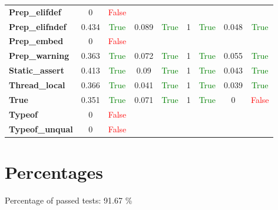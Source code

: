 \documentclass{article}
\begin{document}
\begin{xltabular}{\textwidth}{lcccccccc}
\textbf{Prep\_elifdef}& 0&\textcolor{red}{False} \\[0.5ex]
\textbf{Prep\_elifndef}& 0.434&\textcolor{green}{True}& 0.089&\textcolor{green}{True}& 1&\textcolor{green}{True}& 0.048&\textcolor{green}{True} \\[0.5ex]
\textbf{Prep\_embed}& 0&\textcolor{red}{False} \\[0.5ex]
\textbf{Prep\_warning}& 0.363&\textcolor{green}{True}& 0.072&\textcolor{green}{True}& 1&\textcolor{green}{True}& 0.055&\textcolor{green}{True} \\[0.5ex]
\textbf{Static\_assert}& 0.413&\textcolor{green}{True}& 0.09&\textcolor{green}{True}& 1&\textcolor{green}{True}& 0.043&\textcolor{green}{True} \\[0.5ex]
\textbf{Thread\_local}& 0.366&\textcolor{green}{True}& 0.041&\textcolor{green}{True}& 1&\textcolor{green}{True}& 0.039&\textcolor{green}{True} \\[0.5ex]
\textbf{True}& 0.351&\textcolor{green}{True}& 0.071&\textcolor{green}{True}& 1&\textcolor{green}{True}& 0&\textcolor{red}{False} \\[0.5ex]
\textbf{Typeof}& 0&\textcolor{red}{False} \\[0.5ex]
\textbf{Typeof\_unqual}& 0&\textcolor{red}{False} \\[0.5ex]
\bottomrule
\end{xltabular}
\newpage
\section{Percentages}Percentage of passed tests:
91.67 \%\end{document}
\end{document}
